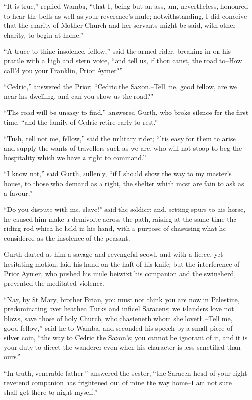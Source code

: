 ``It is true,'' replied Wamba, ``that I, being but an ass, am,
nevertheless, honoured to hear the bells as well as your reverence's
mule; notwithstanding, I did conceive that the charity of Mother Church
and her servants might be said, with other charity, to begin at home.''

``A truce to thine insolence, fellow,'' said the armed rider, breaking
in on his prattle with a high and stern voice, ``and tell us, if thou
canst, the road to--How call'd you your Franklin, Prior Aymer?''

``Cedric,'' answered the Prior; ``Cedric the Saxon.--Tell me, good
fellow, are we near his dwelling, and can you show us the road?''

``The road will be uneasy to find,'' answered Gurth, who broke silence
for the first time, ``and the family of Cedric retire early to rest.''

``Tush, tell not me, fellow,'' said the military rider; ``'tis easy for
them to arise and supply the wants of travellers such as we are, who
will not stoop to beg the hospitality which we have a right to
command.''

``I know not,'' said Gurth, sullenly, ``if I should show the way to my
master's house, to those who demand as a right, the shelter which most
are fain to ask as a favour.''

``Do you dispute with me, slave!'' said the soldier; and, setting spurs
to his horse, he caused him make a demivolte across the path, raising at
the same time the riding rod which he held in his hand, with a purpose
of chastising what he considered as the insolence of the peasant.

Gurth darted at him a savage and revengeful scowl, and with a fierce,
yet hesitating motion, laid his hand on the haft of his knife; but the
interference of Prior Aymer, who pushed his mule betwixt his companion
and the swineherd, prevented the meditated violence.

``Nay, by St Mary, brother Brian, you must not think you are now in
Palestine, predominating over heathen Turks and infidel Saracens; we
islanders love not blows, save those of holy Church, who chasteneth whom
she loveth.--Tell me, good fellow,'' said he to Wamba, and seconded his
speech by a small piece of silver coin, ``the way to Cedric the Saxon's;
you cannot be ignorant of it, and it is your duty to direct the wanderer
even when his character is less sanctified than ours.''

``In truth, venerable father,'' answered the Jester, ``the Saracen head
of your right reverend companion has frightened out of mine the way
home--I am not sure I shall get there to-night myself.''

